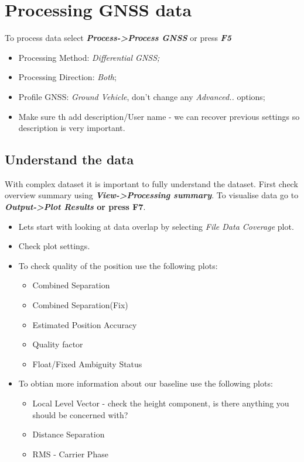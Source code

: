 \documentclass[british]{book}
\begin{document}
\section{Processing GNSS data}\label{sec:GPS-process}

To process data select \textbf{\emph{Process->Process GNSS}} or press \textbf{\emph{F5}}

\begin{itemize}
	\item Processing Method: \emph{Differential GNSS;}
	\item Processing Direction: \emph{Both};
	\item Profile GNSS: \emph{Ground Vehicle}, don't change any \emph{Advanced..}
	options;
	\item Make sure th add description/User name - we can recover previous settings so description is very important.
\end{itemize}


\subsection{Understand the data}

With complex dataset it is important to fully understand the dataset. First check overview summary using \textbf{\emph{View->Processing summary}}. To visualise data go to \textbf{\emph{Output->Plot Results} or press \textbf{F7}}.

\begin{itemize}
	\item Lets start with looking at data overlap by selecting\emph{ File Data Coverage} plot. 
	\item Check plot settings.
	\item To check quality of the position use the following plots:
	\begin{itemize}
		\item Combined Separation
		\item Combined Separation(Fix)
		\item Estimated Position Accuracy
		\item Quality factor
		\item Float/Fixed Ambiguity Status
\end{itemize}
	\item To obtian more information about our baseline use the following plots:
	\begin{itemize}
		\item Local Level Vector - check the height component, is there anything you should be concerned with?
		\item Distance Separation
		\item RMS - Carrier Phase
	\end{itemize}
\end{itemize}
\end{document}
